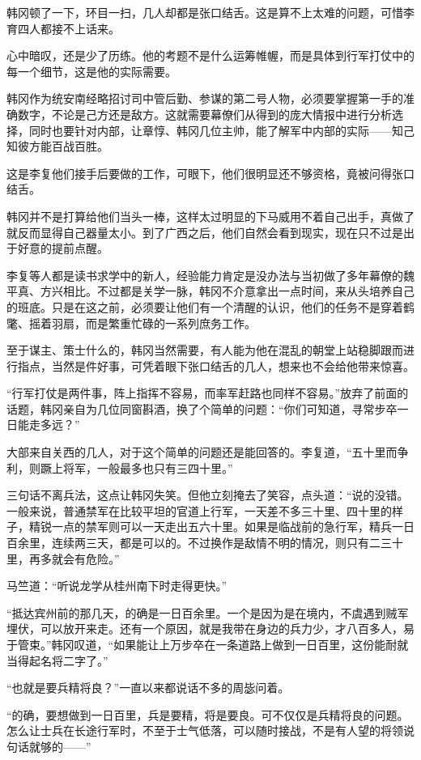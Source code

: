 韩冈顿了一下，环目一扫，几人却都是张口结舌。这是算不上太难的问题，可惜李育四人都接不上话来。

心中暗叹，还是少了历练。他的考题不是什么运筹帷幄，而是具体到行军打仗中的每一个细节，这是他的实际需要。

韩冈作为统安南经略招讨司中管后勤、参谋的第二号人物，必须要掌握第一手的准确数字，不论是己方还是敌方。这就需要幕僚们从得到的庞大情报中进行分析选择，同时也要针对内部，让章惇、韩冈几位主帅，能了解军中内部的实际——知己知彼方能百战百胜。

这是李复他们接手后要做的工作，可眼下，他们很明显还不够资格，竟被问得张口结舌。

韩冈并不是打算给他们当头一棒，这样太过明显的下马威用不着自己出手，真做了就反而显得自己器量太小。到了广西之后，他们自然会看到现实，现在只不过是出于好意的提前点醒。

李复等人都是读书求学中的新人，经验能力肯定是没办法与当初做了多年幕僚的魏平真、方兴相比。不过都是关学一脉，韩冈不介意拿出一点时间，来从头培养自己的班底。只是在这之前，必须要让他们有一个清醒的认识，他们的任务不是穿着鹤氅、摇着羽扇，而是繁重忙碌的一系列庶务工作。

至于谋主、策士什么的，韩冈当然需要，有人能为他在混乱的朝堂上站稳脚跟而进行指点，当然是件好事，可凭着眼下张口结舌的几人，想来也不会给他带来惊喜。

“行军打仗是两件事，阵上指挥不容易，而率军赶路也同样不容易。”放弃了前面的话题，韩冈亲自为几位同窗斟酒，换了个简单的问题：“你们可知道，寻常步卒一日能走多远？”

大部来自关西的几人，对于这个简单的问题还是能回答的。李复道，“五十里而争利，则蹶上将军，一般最多也只有三四十里。”

三句话不离兵法，这点让韩冈失笑。但他立刻掩去了笑容，点头道：“说的没错。一般来说，普通禁军在比较平坦的官道上行军，一天差不多三十里、四十里的样子，精锐一点的禁军则可以一天走出五六十里。如果是临战前的急行军，精兵一日百余里，连续两三天，都是可以的。不过换作是敌情不明的情况，则只有二三十里，再多就会有危险。”

马竺道：“听说龙学从桂州南下时走得更快。”

“抵达宾州前的那几天，的确是一日百余里。一个是因为是在境内，不虞遇到贼军埋伏，可以放开来走。还有一个原因，就是我带在身边的兵力少，才八百多人，易于管束。”韩冈叹道，“如果能让上万步卒在一条道路上做到一日百里，这份能耐就当得起名将二字了。”

“也就是要兵精将良？”一直以来都说话不多的周毖问着。

“的确，要想做到一日百里，兵是要精，将是要良。可不仅仅是兵精将良的问题。怎么让士兵在长途行军时，不至于士气低落，可以随时接战，不是有人望的将领说句话就够的——”

